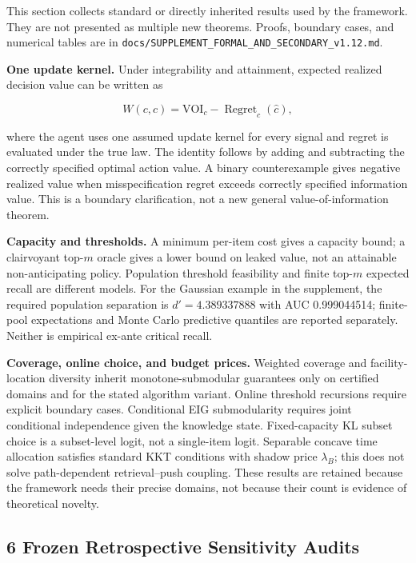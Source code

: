 \documentclass[
  11pt]{article}
\begin{document}
This section collects standard or directly inherited results used by the
framework. They are not presented as multiple new theorems. Proofs,
boundary cases, and numerical tables are in
\texttt{docs/SUPPLEMENT\_FORMAL\_AND\_SECONDARY\_v1.12.md}.

\textbf{One update kernel.} Under integrability and attainment, expected
realized decision value can be written as

\[W(c,\hat c)=\mathrm{VOI}_c-\operatorname{Regret}_c(\hat c),\tag{7}\]

where the agent uses one assumed update kernel for every signal and
regret is evaluated under the true law. The identity follows by adding
and subtracting the correctly specified optimal action value. A binary
counterexample gives negative realized value when misspecification
regret exceeds correctly specified information value. This is a boundary
clarification, not a new general value-of-information theorem.

\textbf{Capacity and thresholds.} A minimum per-item cost gives a
capacity bound; a clairvoyant top-\(m\) oracle gives a lower bound on
leaked value, not an attainable non-anticipating policy. Population
threshold feasibility and finite top-\(m\) expected recall are different
models. For the Gaussian example in the supplement, the required
population separation is \(d'=4.389337888\) with AUC 0.999044514;
finite-pool expectations and Monte Carlo predictive quantiles are
reported separately. Neither is empirical ex-ante critical recall.

\textbf{Coverage, online choice, and budget prices.} Weighted coverage
and facility-location diversity inherit monotone-submodular guarantees
only on certified domains and for the stated algorithm variant. Online
threshold recursions require explicit boundary cases. Conditional EIG
submodularity requires joint conditional independence given the
knowledge state. Fixed-capacity KL subset choice is a subset-level
logit, not a single-item logit. Separable concave time allocation
satisfies standard KKT conditions with shadow price \(\lambda_B\); this
does not solve path-dependent retrieval--push coupling. These results
are retained because the framework needs their precise domains, not
because their count is evidence of theoretical novelty.

\subsection{6 Frozen Retrospective Sensitivity
Audits}\label{frozen-retrospective-sensitivity-audits}
\end{document}
